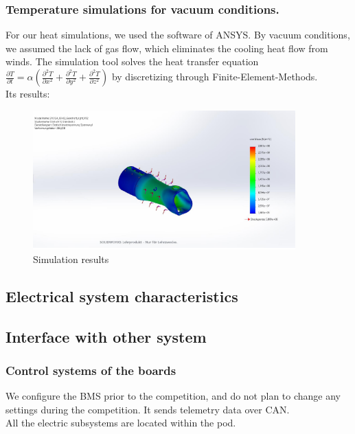 \subsubsection{Temperature simulations for vacuum conditions.}
For our heat simulations, we used the software of ANSYS. By vacuum conditions, we assumed the
lack of gas flow, which eliminates the cooling heat flow from winds. The simulation tool solves
the heat transfer equation \( \frac{\partial T}{\partial t} = \alpha \left( \frac{\partial^2 T}{\partial x^2} + \frac{\partial^2 T}{\partial y^2} + \frac{\partial^2 T}{\partial z^2} \right) \)
by discretizing through Finite-Element-Methods. \\
Its results:
\begin{figure}[H]
    \centering
    \includegraphics[width=0.9\textwidth]{texfiles/elec/eimg/SimulationTemplate}
    \caption{Simulation results}
    \label{img: simresults_battery}
\end{figure}

\subsection{Electrical system characteristics}
\subsection{Interface with other system}
\subsubsection{Control systems of the boards}
We configure the BMS prior to the competition, and do not plan to change any settings during the competition. It sends telemetry data over CAN. \\
All the electric subsystems are located within the pod. \\

